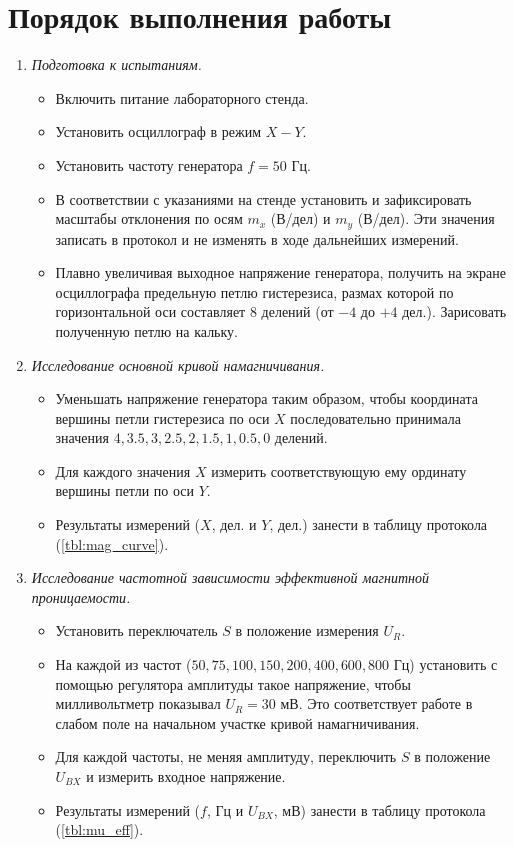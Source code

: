 \section*{Порядок выполнения работы}
\begin{enumerate}
	\item \textit{Подготовка к испытаниям.}
	      \begin{itemize}
		      \item Включить питание лабораторного стенда.
		      \item Установить осциллограф в режим $X-Y$.
		      \item Установить частоту генератора $f = 50$ Гц.
		      \item В соответствии с указаниями на стенде установить и зафиксировать масштабы отклонения по осям $m_x$ (В/дел) и $m_y$ (В/дел). Эти значения записать в протокол и не изменять в ходе дальнейших измерений.
		      \item Плавно увеличивая выходное напряжение генератора, получить на экране осциллографа предельную петлю гистерезиса, размах которой по горизонтальной оси составляет 8 делений (от $-4$ до $+4$ дел.). Зарисовать полученную петлю на кальку.
	      \end{itemize}

	\item \textit{Исследование основной кривой намагничивания.}
	      \begin{itemize}
		      \item Уменьшать напряжение генератора таким образом, чтобы координата вершины петли гистерезиса по оси $X$ последовательно принимала значения $4, 3.5, 3, 2.5, 2, 1.5, 1, 0.5, 0$ делений.
		      \item Для каждого значения $X$ измерить соответствующую ему ординату вершины петли по оси $Y$.
		      \item Результаты измерений ($X$, дел. и $Y$, дел.) занести в таблицу протокола (\cref{tbl:mag_curve}).
	      \end{itemize}

	\item \textit{Исследование частотной зависимости эффективной магнитной проницаемости.}
	      \begin{itemize}
		      \item Установить переключатель $S$ в положение измерения $U_R$.
		      \item На каждой из частот ($50, 75, 100, 150, 200, 400, 600, 800$ Гц) установить с помощью регулятора амплитуды такое напряжение, чтобы милливольтметр показывал $U_R = 30$ мВ. Это соответствует работе в слабом поле на начальном участке кривой намагничивания.
		      \item Для каждой частоты, не меняя амплитуду, переключить $S$ в положение $U_{BX}$ и измерить входное напряжение.
		      \item Результаты измерений ($f$, Гц и $U_{BX}$, мВ) занести в таблицу протокола (\cref{tbl:mu_eff}).
	      \end{itemize}
\end{enumerate}